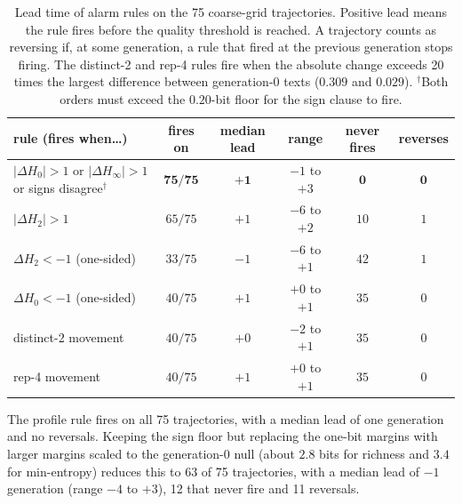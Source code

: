 \documentclass[10pt]{article}
\theoremstyle{plain}
\theoremstyle{definition}
\newcommand{\Htwo}{H_2}
\newcommand{\Hz}{H_0}
\newcommand{\Hinf}{H_\infty}
\begin{document}
\begin{table}[ht]
\centering\small
\caption{Lead time of alarm rules on the 75 coarse-grid trajectories. Positive lead means the rule
fires before the quality threshold is reached. A trajectory counts as reversing if, at some
generation, a rule that fired at the previous generation stops firing. The distinct-2 and rep-4
rules fire when the absolute change exceeds 20 times the largest difference between generation-0
texts ($0.309$ and $0.029$). $^\dagger$Both orders must exceed the $0.20$-bit floor for the sign
clause to fire.}
\label{tab:leadtime}
\begin{tabular}{lccccc}
\toprule
rule (fires when\ldots) & fires on & median lead & range & never fires & reverses \\
\midrule
$|\Delta\Hz|>1$ or $|\Delta\Hinf|>1$ or signs disagree$^\dagger$ & $\mathbf{75/75}$ & $\mathbf{+1}$ & $-1$ to $+3$ & $\mathbf{0}$ & $\mathbf{0}$ \\
$|\Delta\Htwo|>1$ & $65/75$ & $+1$ & $-6$ to $+2$ & $10$ & $1$ \\
$\Delta\Htwo<-1$ (one-sided) & $33/75$ & $-1$ & $-6$ to $+1$ & $42$ & $1$ \\
$\Delta\Hz<-1$ (one-sided) & $40/75$ & $+1$ & $+0$ to $+1$ & $35$ & $0$ \\
distinct-2 movement & $40/75$ & $+0$ & $-2$ to $+1$ & $35$ & $0$ \\
rep-4 movement & $40/75$ & $+1$ & $+0$ to $+1$ & $35$ & $0$ \\
\bottomrule
\end{tabular}
\end{table}

The profile rule fires on all 75 trajectories, with a median lead of one generation and no
reversals. Keeping the sign floor but replacing the one-bit margins with larger margins scaled to
the generation-0 null (about $2.8$ bits for richness and $3.4$ for min-entropy) reduces this to 63 of 75 trajectories,
with a median lead of $-1$ generation (range $-4$ to $+3$), 12 that never fire and 11 reversals.
\end{document}
